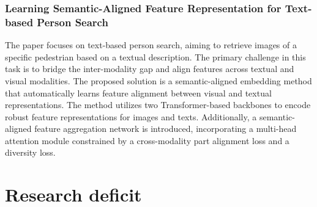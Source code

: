 \subsubsection{Learning Semantic-Aligned Feature Representation for Text-based Person Search}
The paper focuses on text-based person search, aiming to retrieve images of a specific pedestrian based on a textual description. The primary challenge in this task is to bridge the inter-modality gap and align features across textual and visual modalities. The proposed solution is a semantic-aligned embedding method that automatically learns feature alignment between visual and textual representations. The method utilizes two Transformer-based backbones to encode robust feature representations for images and texts. Additionally, a semantic-aligned feature aggregation network is introduced, incorporating a multi-head attention module constrained by a cross-modality part alignment loss and a diversity loss. 



\section{Research deficit}